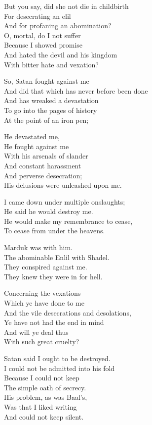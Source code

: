\documentclass[
]{book}
\begin{document}
But you say, did she not die in childbirth\\
For desecrating an elil\\
And for profaning an abomination?\\
O, mortal, do I not suffer\\
Because I showed promise\\
And hated the devil and his kingdom\\
With bitter hate and vexation?

So, Satan fought against me\\
And did that which has never before been done\\
And has wreaked a devastation\\
To go into the pages of history\\
At the point of an iron pen;

He devastated me,\\
He fought against me\\
With his arsenals of slander\\
And constant harassment\\
And perverse desecration;\\
His delusions were unleashed upon me.

I came down under multiple onslaughts;\\
He said he would destroy me.\\
He would make my remembrance to cease,\\
To cease from under the heavens.

Marduk was with him.\\
The abominable Enlil with Shadel.\\
They conspired against me.\\
They knew they were in for hell.

Concerning the vexations\\
Which ye have done to me\\
And the vile desecrations and desolations,\\
Ye have not had the end in mind\\
And will ye deal thus\\
With such great cruelty?

Satan said I ought to be destroyed.\\
I could not be admitted into his fold\\
Because I could not keep\\
The simple oath of secrecy.\\
His problem, as was Baal's,\\
Was that I liked writing\\
And could not keep silent.
\end{document}

